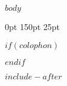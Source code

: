 \documentclass%
[crop=true,varwidth,border=0.50001bp,11pt]
{book} %
\renewcommand{\headrulewidth}{0.0pt} %
\begin{document}
\fancyfoot[C]{} %
\fancyhead[RO,LE]{\primaryfont\bfseries \thepage} %
\fancyhead[LO]{\primaryfont\bfseries \textsc \leftmark} %
\fancyhead[RE]{\primaryfont\bfseries \textsc \@title}
\renewcommand{\headrulewidth}{0.0pt} 
\makeatother

\mainmatter

\primaryfont \normalsize \flushbottom $body$


\clearpage{\thispagestyle{empty}\cleardoublepage}

\backmatter

\pagestyle{empty}

\titlespacing*{\section}
{0pt}%
{150pt}%
{25pt}%

\titleformat{\section}[display]{\bfseries\titlefont}{}{0.5mm}{\centering \Large} %

\setlength{\parindent}{0mm}


$if(colophon)$


\clearpage{\thispagestyle{empty}\cleardoublepage}
$endif$




\clearpage

$include-after$

\end{document}
